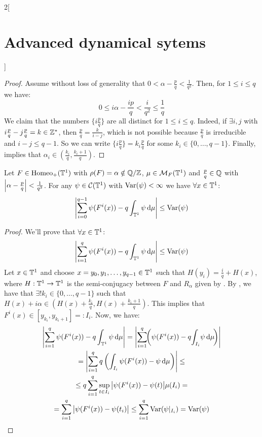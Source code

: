 \documentclass[../../../main_math.tex]{subfiles}
\begin{document}
\begin{multicols}{2}[\section{Advanced dynamical sytems}]
\begin{lemma}
  \end{lemma}
  \begin{proof}
    Assume without loss of generality that $0<\alpha-\frac{p}{q}<\frac{1}{q^2}$. Then, for $1\leq i\leq q$ we have:
    \begin{equation}\label{ADS:ineq_alpha_i}
      0\leq i\alpha -\frac{ip}{q}<\frac{i}{q^2}\leq \frac{1}{q}
    \end{equation}
    We claim that the numbers $\{i \frac{p}{q}\}$ are all distinct for $1\leq i\leq q$. Indeed, if $\exists i,j$ with $i\frac{p}{q} -j\frac{p}{q}=k\in\mathbb{Z}^*$, then $\frac{p}{q}=\frac{k}{i-j}$, which is not possible because $\frac{p}{q}$ is irreducible and $i-j \leq q-1$. So we can write $\{i \frac{p}{q}\}=k_i\frac{p}{q}$ for some $k_i\in\{0,\ldots,q-1\}$. Finally,  implies that $\alpha_i\in \left(\frac{k_i}{q},\frac{k_i+1}{q}\right)$.
  \end{proof}
  \begin{proposition}\label{ADS:denjoy_koksma}
    Let $F\in\mathrm{Homeo}_+(\mathbb{T}^1)$ with $\rho(F)=\alpha\notin \quot{\QQ}{\ZZ}$, $\mu\in\mathcal{M}_F(\mathbb{T}^1)$ and $\frac{p}{q}\in \mathbb{Q}$ with $\abs{\alpha-\frac{p}{q}}<\frac{1}{q^2}$. For any $\psi\in \mathcal{C}(\mathbb{T}^1)$ with $\mathrm{Var}(\psi)<\infty$ we have $\forall x \in \mathbb{T}^1$:
    $$
      \abs{\sum_{i=0}^{q-1}\psi(F^i(x))-q\int_{\mathbb{T}^1}\psi\dd{\mu}}\leq\mathrm{Var}(\psi)
    $$
  \end{proposition}
  \begin{proof}
    We'll prove that $\forall x\in \mathbb{T}^1$:
    $$
      \abs{\sum_{i=1}^q \psi(F^i(x))-q\int_{\mathbb{T}^1}\psi\dd{\mu}}\leq \mathrm{Var}(\psi)
    $$
    Let $x\in \mathbb{T}^1$ and choose $x=y_0,y_1,\ldots,y_{q-1}\in \mathbb{T}^1$ such that $H(y_i)=\frac{i}{q}+H(x)$, where $H:\mathbb{T}^1\to \mathbb{T}^1$ is the semi-conjugacy between $F$ and $R_\alpha$ given by . By , we have that $\exists! k_i\in\{0,\ldots,q-1\}$ such that $H(x)+i\alpha\in\left( H(x)+ \frac{k_i}{q},H(x)+\frac{k_i+1}{q}\right)$. This implies that $F^i(x)\in [y_{k_i},y_{k_i+1}]=:I_i$. Now, we have:
    \begin{multline*}
      \abs{\sum_{i=1}^q \psi(F^i(x))-q\int_{\TT^1}\psi\dd{\mu}}=\abs{\sum_{i=1}^q\!\! \left(\psi(F^i(x))-q\!\int_{I_i}\! \psi\dd{\mu}\!\right)}\\=\abs{\sum_{i=1}^q q\left(\int_{I_i}\psi(F^i(x))-\psi \dd{\mu}\right)}\leq\\\leq q \sum_{i=1}^q \sup_{t\in I_i}\abs{\psi(F^i(x))-\psi(t)}\mu(I_i)=\\=\sum_{i=1}^q \abs{\psi(F^i(x))-\psi(t_i)}\leq \sum_{i=1}^q \Var(\psi|_{I_i})= \Var(\psi)

\end{multline*}
\end{proof}
\end{multicols}
\end{document}
